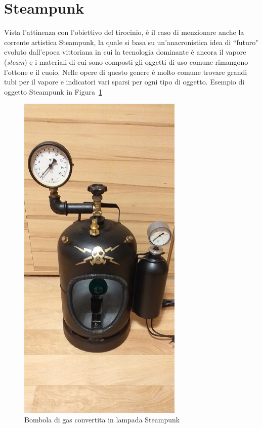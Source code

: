 \documentclass[12pt,a4paper]{report}
\begin{document}
\section{Steampunk}
Vista l'attinenza con l'obiettivo del tirocinio, è il caso di menzionare anche la corrente artistica Steampunk, la quale si basa su
un'anacronistica idea di ``futuro" evoluto dall'epoca vittoriana in cui la tecnologia dominante è ancora il vapore (\emph{steam})
e i materiali di cui sono composti gli oggetti di uso comune rimangono l'ottone e il cuoio. \cite{focussteampunk}
Nelle opere di questo genere è molto comune trovare grandi tubi per il vapore e indicatori vari sparsi per ogni tipo di oggetto.
Esempio di oggetto Steampunk in Figura~\ref{fig:steampunklamp}

\begin{figure}[h]
  \centering
  \includegraphics[width=0.7\textwidth]{steampunklamp}
  \caption{Bombola di gas convertita in lampada Steampunk \cite{wiki:steampunklamp}}
  \label{fig:steampunklamp}
\end{figure}
\end{document}
